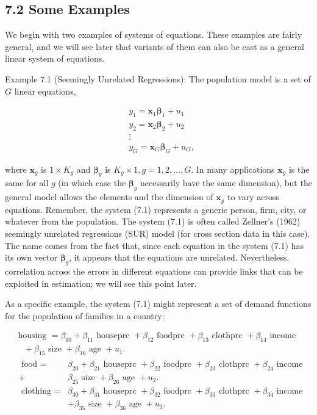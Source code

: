\documentclass[10pt]{article}
\begin{document}
\subsection*{7.2 Some Examples}
We begin with two examples of systems of equations. These examples are fairly general, and we will see later that variants of them can also be cast as a general linear system of equations.

Example 7.1 (Seemingly Unrelated Regressions): The population model is a set of $G$ linear equations,


\begin{align*}
& y_{1}=\mathbf{x}_{1} \boldsymbol{\beta}_{1}+u_{1} \\
& y_{2}=\mathbf{x}_{2} \boldsymbol{\beta}_{2}+u_{2}  \tag{7.1}\\
& \vdots \\
& y_{G}=\mathbf{x}_{G} \boldsymbol{\beta}_{G}+u_{G},
\end{align*}


where $\mathbf{x}_{g}$ is $1 \times K_{g}$ and $\boldsymbol{\beta}_{g}$ is $K_{g} \times 1, g=1,2, \ldots, G$. In many applications $\mathbf{x}_{g}$ is the same for all $g$ (in which case the $\boldsymbol{\beta}_{g}$ necessarily have the same dimension), but the general model allows the elements and the dimension of $\mathbf{x}_{g}$ to vary across equations. Remember, the system (7.1) represents a generic person, firm, city, or whatever from the population. The system (7.1) is often called Zellner's (1962) seemingly unrelated regressions (SUR) model (for cross section data in this case). The name comes from the fact that, since each equation in the system (7.1) has its own vector $\boldsymbol{\beta}_{g}$, it appears that the equations are unrelated. Nevertheless, correlation across the errors in different equations can provide links that can be exploited in estimation; we will see this point later.

As a specific example, the system (7.1) might represent a set of demand functions for the population of families in a country:

$$
\begin{aligned}
& \text { housing }=\beta_{10}+\beta_{11} \text { houseprc }+\beta_{12} \text { foodprc }+\beta_{13} \text { clothprc }+\beta_{14} \text { income } \\
& \quad+\beta_{15} \text { size }+\beta_{16} \text { age }+u_{1} \text {. } \\
& \begin{aligned}
\text { food }= & \beta_{20}+\beta_{21} \text { houseprc }+\beta_{22} \text { foodprc }+\beta_{23} \text { clothprc }+\beta_{24} \text { income } \\
+ & \beta_{25} \text { size }+\beta_{26} \text { age }+u_{2} \text {. } \\
\text { clothing }= & \beta_{30}+\beta_{31} \text { houseprc }+\beta_{32} \text { foodprc }+\beta_{33} \text { clothprc }+\beta_{34} \text { income } \\
& +\beta_{35} \text { size }+\beta_{36} \text { age }+u_{3} \text {. }
\end{aligned}
\end{aligned}
$$
\end{document}
